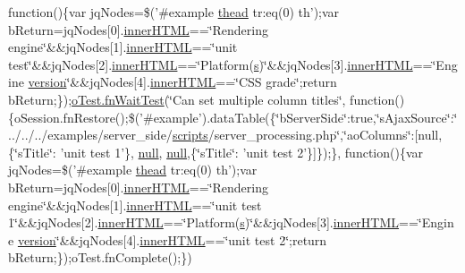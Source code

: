 \begin{DoxyCompactItemize}
function()\{var jq\+Nodes=\$('\#example \hyperlink{core_8constructor_8js_a856be760b6816c9591ce69f0a2b43693}{thead} tr\+:eq(0) th');var b\+Return=jq\+Nodes\mbox{[}0\mbox{]}.\hyperlink{jquery-ui_8js_a87f73c4f0391c1cf9fe60374a76d9a7b}{inner\+H\+T\+M\+L}==\char`\"{}Rendering engine\char`\"{}\&\&jq\+Nodes\mbox{[}1\mbox{]}.\hyperlink{jquery-ui_8js_a87f73c4f0391c1cf9fe60374a76d9a7b}{inner\+H\+T\+M\+L}==\char`\"{}unit test\char`\"{}\&\&jq\+Nodes\mbox{[}2\mbox{]}.\hyperlink{jquery-ui_8js_a87f73c4f0391c1cf9fe60374a76d9a7b}{inner\+H\+T\+M\+L}==\char`\"{}Platform(\hyperlink{validate_8js_ae059f217efaf1d50696a1214c3ce5748}{s})\char`\"{}\&\&jq\+Nodes\mbox{[}3\mbox{]}.\hyperlink{jquery-ui_8js_a87f73c4f0391c1cf9fe60374a76d9a7b}{inner\+H\+T\+M\+L}==\char`\"{}Engine \hyperlink{jquery-ui_8js_a8fa514f3aed7ddc8bfb00ed5aea5b5e2}{version}\char`\"{}\&\&jq\+Nodes\mbox{[}4\mbox{]}.\hyperlink{jquery-ui_8js_a87f73c4f0391c1cf9fe60374a76d9a7b}{inner\+H\+T\+M\+L}==\char`\"{}C\+S\+S grade\char`\"{};return b\+Return;\});\hyperlink{onhold_24__server-side_2__zero__config_8js_ab25c4d596771c0133cdc45178ce72c3d}{o\+Test.\+fn\+Wait\+Test}(\char`\"{}Can set multiple column titles\char`\"{}, function()\{o\+Session.\+fn\+Restore();\$('\#example').data\+Table(\{\char`\"{}b\+Server\+Side\char`\"{}\+:true,\char`\"{}s\+Ajax\+Source\char`\"{}\+:\char`\"{}../../../examples/server\+\_\+side/\hyperlink{tinymce_8jquery_8dev_8js_a09066d4d580eeec222f858d588b4cdef}{scripts}/server\+\_\+processing.\+php\char`\"{},\char`\"{}ao\+Columns\char`\"{}\+:\mbox{[}null,\{\char`\"{}s\+Title\char`\"{}\+: 'unit test 1'\}, \hyperlink{validate_8js_afb8e110345c45e74478894341ab6b28e}{null}, \hyperlink{validate_8js_afb8e110345c45e74478894341ab6b28e}{null},\{\char`\"{}s\+Title\char`\"{}\+: 'unit test 2'\}\mbox{]}\});\}, function()\{var jq\+Nodes=\$('\#example \hyperlink{core_8constructor_8js_a856be760b6816c9591ce69f0a2b43693}{thead} tr\+:eq(0) th');var b\+Return=jq\+Nodes\mbox{[}0\mbox{]}.\hyperlink{jquery-ui_8js_a87f73c4f0391c1cf9fe60374a76d9a7b}{inner\+H\+T\+M\+L}==\char`\"{}Rendering engine\char`\"{}\&\&jq\+Nodes\mbox{[}1\mbox{]}.\hyperlink{jquery-ui_8js_a87f73c4f0391c1cf9fe60374a76d9a7b}{inner\+H\+T\+M\+L}==\char`\"{}unit test 1\char`\"{}\&\&jq\+Nodes\mbox{[}2\mbox{]}.\hyperlink{jquery-ui_8js_a87f73c4f0391c1cf9fe60374a76d9a7b}{inner\+H\+T\+M\+L}==\char`\"{}Platform(\hyperlink{validate_8js_ae059f217efaf1d50696a1214c3ce5748}{s})\char`\"{}\&\&jq\+Nodes\mbox{[}3\mbox{]}.\hyperlink{jquery-ui_8js_a87f73c4f0391c1cf9fe60374a76d9a7b}{inner\+H\+T\+M\+L}==\char`\"{}Engine \hyperlink{jquery-ui_8js_a8fa514f3aed7ddc8bfb00ed5aea5b5e2}{version}\char`\"{}\&\&jq\+Nodes\mbox{[}4\mbox{]}.\hyperlink{jquery-ui_8js_a87f73c4f0391c1cf9fe60374a76d9a7b}{inner\+H\+T\+M\+L}==\char`\"{}unit test 2\char`\"{};return b\+Return;\});o\+Test.\+fn\+Complete();\})
\end{DoxyCompactItemize}


